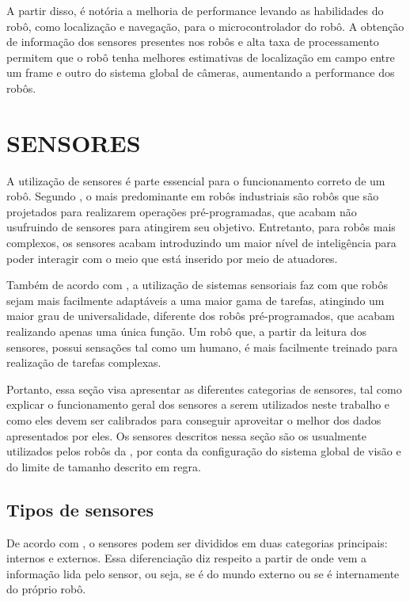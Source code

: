\documentclass[acronym, symbols, table]{fei}
\begin{document}
				A partir disso, é notória a melhoria de performance levando as habilidades do robô, como localização e navegação, para o microcontrolador do robô. A obtenção de informação dos sensores presentes nos robôs e alta taxa de processamento permitem que o robô tenha melhores estimativas de localização em campo entre um frame e outro do sistema global de câmeras, aumentando a performance dos robôs.
		
	\section{SENSORES} \label{sec:sensores}
	
		A utilização de sensores é parte essencial para o funcionamento correto de um robô. Segundo \textcite{de2017tipos}, o mais predominante em robôs industriais são robôs que são projetados para realizarem operações pré-programadas, que acabam não usufruindo de sensores para atingirem seu objetivo. Entretanto, para robôs mais complexos, os sensores acabam introduzindo um maior nível de inteligência para poder interagir com o meio que está inserido por meio de atuadores.
		
		Também de acordo com \textcite{de2017tipos}, a utilização de sistemas sensoriais faz com que robôs sejam mais facilmente adaptáveis a uma maior gama de tarefas, atingindo um maior grau de universalidade, diferente dos robôs pré-programados, que acabam realizando apenas uma única função. Um robô que, a partir da leitura dos sensores, possui sensações tal como um humano, é mais facilmente treinado para realização de tarefas complexas.
		
		Portanto, essa seção visa apresentar as diferentes categorias de sensores, tal como explicar o funcionamento geral dos sensores a serem utilizados neste trabalho e como eles devem ser calibrados para conseguir aproveitar o melhor dos dados apresentados por eles. Os sensores descritos nessa seção são os usualmente utilizados pelos robôs da , por conta da configuração do sistema global de visão e do limite de tamanho descrito em regra.
		
		\subsection{Tipos de sensores}		
		
			De acordo com \textcite{sensorFusionKalmanFilter}, o sensores podem ser divididos em duas categorias principais: internos e externos. Essa diferenciação diz respeito a partir de onde vem a informação lida pelo sensor, ou seja, se é do mundo externo ou se é internamente do próprio robô.
			
\end{document}
